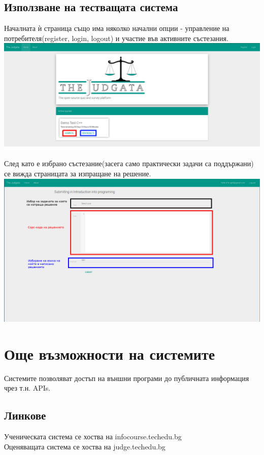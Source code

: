 \documentclass[12pt]{article}
\begin{document}
	\subsection{Използване на тестващата система}
	Началната ѝ страница също има няколко начални опции - управление на потребителя(register, login, logout) и участие във активните състезания.\\
  \includegraphics[width=1\textwidth]{judge_home.png}\\
	\\След като е избрано състезание(засега само практически задачи са поддържани) се вижда страницата за изпращане на решение.\\
	\includegraphics[width=1\textwidth]{judge_submi.png}\\
	\section{Още възможности на системите}
	Системите позволяват достъп на външни програми до публичната информация чрез т.н. APIs.
	\subsection{Линкове}
	Ученическата система се хоства на infocourse.techedu.bg \\
	Оценяващата система се хоства на judge.techedu.bg
\end{document}
